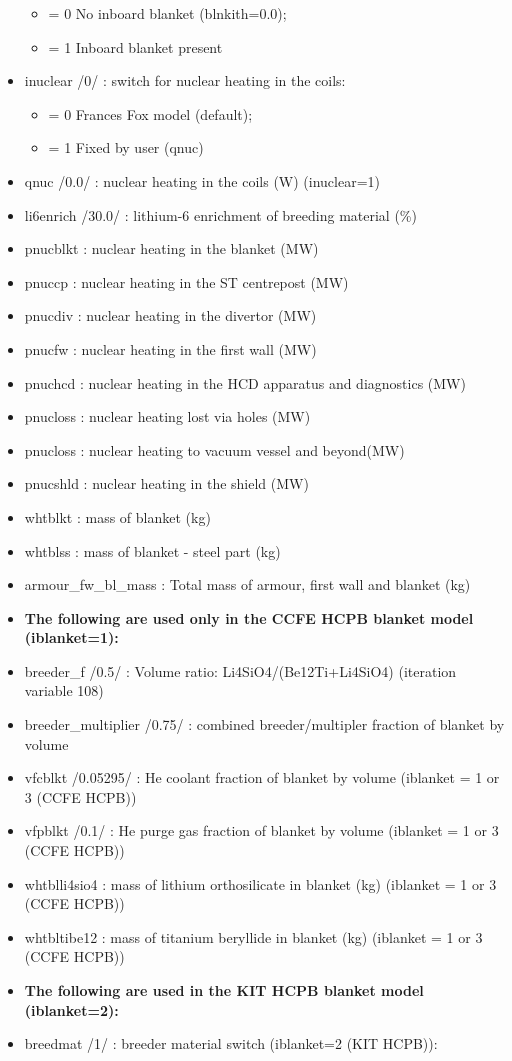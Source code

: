 \documentclass[]{article}
\providecommand{\tightlist}{%
  \setlength{\itemsep}{0pt}\setlength{\parskip}{0pt}}
\begin{document}
\begin{itemize}
  \begin{itemize}
  \tightlist
  \item
    = 0 No inboard blanket (blnkith=0.0);
  \item
    = 1 Inboard blanket present
  \end{itemize}
\item
  inuclear /0/ : switch for nuclear heating in the coils:

  \begin{itemize}
  \tightlist
  \item
    = 0 Frances Fox model (default);
  \item
    = 1 Fixed by user (qnuc)
  \end{itemize}
\item
  qnuc /0.0/ : nuclear heating in the coils (W) (inuclear=1)
\item
  li6enrich /30.0/ : lithium-6 enrichment of breeding material (\%)
\item
  pnucblkt : nuclear heating in the blanket (MW)
\item
  pnuccp : nuclear heating in the ST centrepost (MW)
\item
  pnucdiv : nuclear heating in the divertor (MW)
\item
  pnucfw : nuclear heating in the first wall (MW)
\item
  pnuchcd : nuclear heating in the HCD apparatus and diagnostics (MW)
\item
  pnucloss : nuclear heating lost via holes (MW)
\item
  pnucloss : nuclear heating to vacuum vessel and beyond(MW)
\item
  pnucshld : nuclear heating in the shield (MW)
\item
  whtblkt : mass of blanket (kg)
\item
  whtblss : mass of blanket - steel part (kg)
\item
  armour\_fw\_bl\_mass : Total mass of armour, first wall and blanket
  (kg)
\item
  \textbf{The following are used only in the CCFE HCPB blanket model
  (iblanket=1):}
\item
  breeder\_f /0.5/ : Volume ratio: Li4SiO4/(Be12Ti+Li4SiO4) (iteration
  variable 108)
\item
  breeder\_multiplier /0.75/ : combined breeder/multipler fraction of
  blanket by volume
\item
  vfcblkt /0.05295/ : He coolant fraction of blanket by volume (iblanket
  = 1 or 3 (CCFE HCPB))
\item
  vfpblkt /0.1/ : He purge gas fraction of blanket by volume (iblanket =
  1 or 3 (CCFE HCPB))
\item
  whtblli4sio4 : mass of lithium orthosilicate in blanket (kg) (iblanket
  = 1 or 3 (CCFE HCPB))
\item
  whtbltibe12 : mass of titanium beryllide in blanket (kg) (iblanket = 1
  or 3 (CCFE HCPB))
\item
  \textbf{The following are used in the KIT HCPB blanket model
  (iblanket=2):}
\item
  breedmat /1/ : breeder material switch (iblanket=2 (KIT HCPB)):


\end{itemize}
\end{document}
